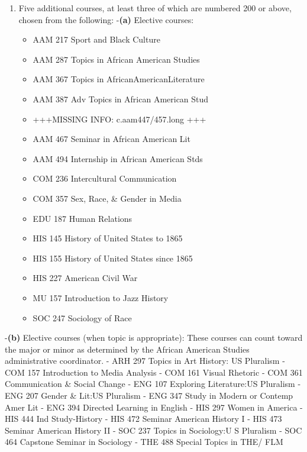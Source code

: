\documentclass[
  letterpaper,
]{scrbook}
\providecommand{\tightlist}{%
  \setlength{\itemsep}{0pt}\setlength{\parskip}{0pt}}
\begin{document}
\begin{enumerate}
\def\labelenumi{\arabic{enumi}.}
\setcounter{enumi}{4}
\tightlist
\item
  Five additional courses, at least three of which are numbered 200 or
  above, chosen from the following: -\textbf{(a)} Elective courses:

  \begin{itemize}
  \tightlist
  \item
    AAM 217 Sport and Black Culture
  \item
    AAM 287 Topics in African American Studies
  \item
    AAM 367 Topics in AfricanAmericanLiterature
  \item
    AAM 387 Adv Topics in African American Stud
  \item
    +++MISSING INFO: c.aam447/457.long +++
  \item
    AAM 467 Seminar in African American Lit
  \item
    AAM 494 Internship in African American Stds
  \item
    COM 236 Intercultural Communication
  \item
    COM 357 Sex, Race, \& Gender in Media
  \item
    EDU 187 Human Relations
  \item
    HIS 145 History of United States to 1865
  \item
    HIS 155 History of United States since 1865
  \item
    HIS 227 American Civil War
  \item
    MU 157 Introduction to Jazz History
  \item
    SOC 247 Sociology of Race
  \end{itemize}
\end{enumerate}

-\textbf{(b)} Elective courses (when topic is appropriate): These
courses can count toward the major or minor as determined by the African
American Studies administrative coordinator. - ARH 297 Topics in Art
History: US Pluralism - COM 157 Introduction to Media Analysis - COM 161
Visual Rhetoric - COM 361 Communication \& Social Change - ENG 107
Exploring Literature:US Pluralism - ENG 207 Gender \& Lit:US Pluralism -
ENG 347 Study in Modern or Contemp Amer Lit - ENG 394 Directed Learning
in English - HIS 297 Women in America - HIS 444 Ind Study-History - HIS
472 Seminar American History I - HIS 473 Seminar American History II -
SOC 237 Topics in Sociology:U S Pluralism - SOC 464 Capstone Seminar in
Sociology - THE 488 Special Topics in THE/ FLM
\end{document}
